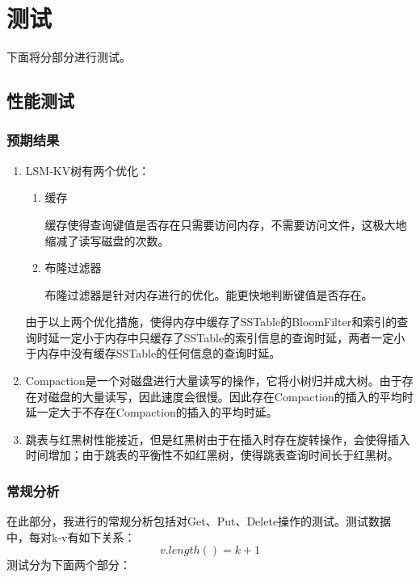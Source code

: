 \documentclass[UTF8]{ctexart}
\begin{document}
\section{测试}
下面将分部分进行测试。

\subsection{性能测试}

\subsubsection{预期结果}

\begin{enumerate}
    \item LSM-KV树有两个优化：
    \begin{enumerate}
        \item 缓存

        缓存使得查询键值是否存在只需要访问内存，不需要访问文件，这极大地缩减了读写磁盘的次数。
        \item 布隆过滤器
        
        布隆过滤器是针对内存进行的优化。能更快地判断键值是否存在。
    \end{enumerate}
    由于以上两个优化措施，使得内存中缓存了SSTable的BloomFilter和索引的查询时延一定小于内存中只缓存了SSTable的索引信息的查询时延，两者一定小于内存中没有缓存SSTable的任何信息的查询时延。
    
    \item Compaction是一个对磁盘进行大量读写的操作，它将小树归并成大树。由于存在对磁盘的大量读写，因此速度会很慢。因此存在Compaction的插入的平均时延一定大于不存在Compaction的插入的平均时延。

    \item 跳表与红黑树性能接近，但是红黑树由于在插入时存在旋转操作，会使得插入时间增加；由于跳表的平衡性不如红黑树，使得跳表查询时间长于红黑树。
\end{enumerate}


\subsubsection{常规分析}
在此部分，我进行的常规分析包括对Get、Put、Delete操作的测试。测试数据中，每对k-v有如下关系：
$$v.length()=k+1$$
测试分为下面两个部分：
\end{document}
